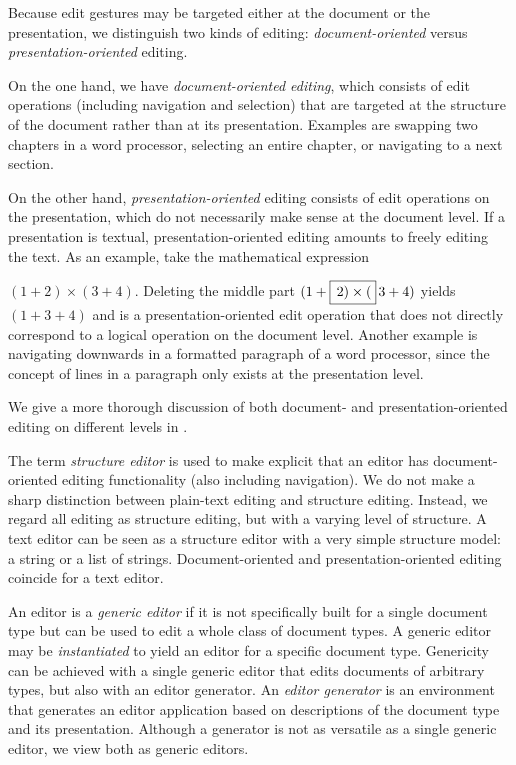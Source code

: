 \documentclass{speauth}
\begin{document}

Because edit gestures may be targeted either at the document or the presentation, we distinguish two kinds of editing:  {\em document-oriented} versus {\em presentation-oriented} editing.

On the one hand, we have {\em document-oriented editing}, which consists of edit operations (including navigation and selection) that are targeted at the structure of the document rather than at its presentation. Examples are swapping two chapters in a word processor, selecting an entire chapter, or navigating to a next section.

On the other hand, {\em presentation-oriented} editing consists of edit operations on the presentation, which do not necessarily make sense at the document level. If a presentation is textual,  presentation-oriented editing amounts to freely editing the text. As an example, take the mathematical expression  

$(1+2) \times (3+4)$. Deleting the middle part $(1+\framebox{$\,2) \times ($}\,3+4)$ yields $(1+3+4)$ and is a presentation-oriented edit operation that does not directly correspond to a logical operation on the document level. Another example is navigating downwards in a formatted paragraph of a word processor, since the concept of lines in a paragraph only exists at the presentation level. 

We give a more thorough discussion of both document- and presentation-oriented  editing on different levels in \cite{proximaarch}. 


The term {\em structure editor} is used to make explicit that an editor has document-oriented editing functionality (also including navigation). We do not make a sharp distinction between plain-text editing and structure editing. Instead, we regard all editing as structure editing, but with a varying level of structure. A text editor can be seen as a structure editor with a very simple structure model: a string or a list of strings. Document-oriented and presentation-oriented editing coincide for a text editor.

An editor is a {\em generic editor} if it is not specifically built for a single document type but can be used to edit a whole class of document types. A generic editor may be {\em instantiated} to yield an editor for a specific document type. Genericity can be achieved with a single generic editor that edits documents of arbitrary types, but also with an editor generator. An {\em editor generator} is an environment that generates an editor application based on descriptions of the document type and its presentation. Although a generator is not as versatile as a single generic editor, we view both as generic editors. 
\end{document}
